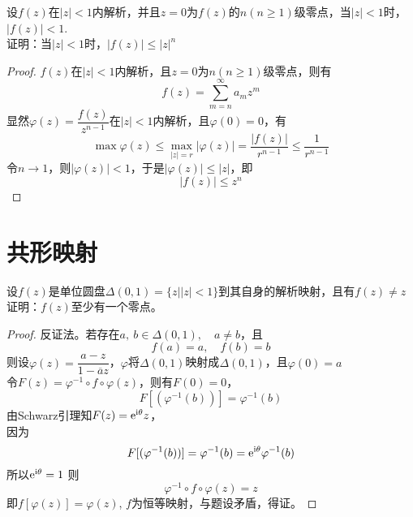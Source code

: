 \begin{proposition}

    设$f(z)$在$|z| < 1 $内解析，并且$z = 0$为$f(z)$的$n(n \geq 1)$级零点，当$|z|<1$时，$|f(z)| < 1$.\\
    证明：当$|z|<1$时，$|f(z)| \leq |z|^n$

\end{proposition}

\begin{proof}
    
    $f(z)$在$|z|<1$内解析，且$z = 0$为$n(n \geq 1)$级零点，则有
    $$f(z) = \sum\limits_{m = n}^{\infty}{a_mz^m}$$
    显然$\varphi(z) = \dfrac{f(z)}{z^{n - 1}}$在$|z|<1$内解析，且$\varphi(0) = 0$，有
    $$ \max\varphi(z) \leq \max_{|z| = r}|\varphi(z)| = \dfrac{|f(z)|}{r^{n - 1}} \leq \dfrac{1}{r^{n - 1}} $$
    令$n \to 1$，则$|\varphi(z)| < 1$，于是$|\varphi(z)| \leq |z|$，即
    $$|f(z)| \leq z^n$$

\end{proof}

\section{共形映射}

\begin{proposition}

    设$f(z)$是单位圆盘$\Delta(0,1) = \{z \big| |z| < 1 \}$到其自身的解析映射，且有$f(z) \neq z$\\
    证明：$f(z)$至少有一个零点。

\end{proposition}

\begin{proof}
    
    反证法。若存在$a,\ b\in \Delta(0,1), \quad a \neq b$，且
    $$f(a) = a, \quad  f(b) = b$$
    则设$\varphi(z) = \dfrac{a-z}{1 - \overline{a}z}$，$\varphi$将$\Delta(0,1)$映射成$\Delta(0,1)$，且$\varphi(0) = a $\\
    令$F(z) = \varphi^{-1} \circ f \circ \varphi(z)$，则有$F(0) = 0$，
    $$F[(\varphi^{-1}(b))] = \varphi^{-1}(b)$$
    由\textup{Schwarz}引理知$F(z) = \mathrm{e}^{\mathrm{i \theta}}z$，\\
    因为
    $$F[(\varphi^{-1}(b))] = \varphi^{-1}(b) = \mathrm{e}^{\mathrm{i \theta}}\varphi^{-1}(b)$$
    所以$ \mathrm{e}^{\mathrm{i \theta}} = 1$
    则
    $$ \varphi^{-1} \circ f \circ \varphi(z) = z$$
    即$ f[\varphi(z)] = \varphi(z)$, $f$为恒等映射，与题设矛盾，得证。

\end{proof}


